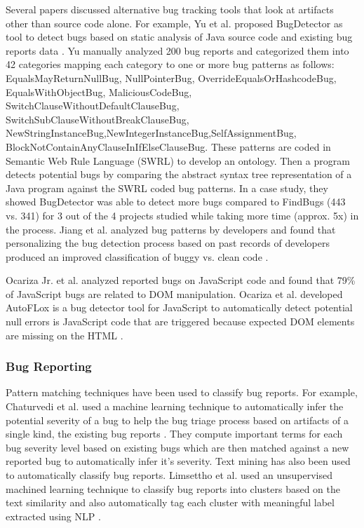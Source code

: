 \documentclass[conference]{IEEEtran}
\begin{document}
Several papers discussed alternative bug tracking tools that look at artifacts other than source code alone. For example, Yu et al. proposed BugDetector as tool to detect bugs based on static analysis of Java source code and existing bug reports data \cite{ontology_lu}. Yu manually analyzed 200 bug reports and categorized them into 42 categories mapping each category to one or more bug patterns as follows: EqualsMayReturnNullBug, NullPointerBug, OverrideEqualsOrHashcodeBug, EqualsWithObjectBug, MaliciousCodeBug, SwitchClauseWithoutDefaultClauseBug, SwitchSubClauseWithoutBreakClauseBug, NewStringInstanceBug,NewIntegerInstanceBug,SelfAssignmentBug, BlockNotContainAnyClauseInIfElseClauseBug. These patterns are coded in Semantic Web Rule Language (SWRL) to develop an ontology. Then a program detects potential bugs by comparing the abstract syntax tree representation of a Java program against the SWRL coded bug patterns. In a case study, they showed BugDetector was able to detect more bugs compared to FindBugs (443 vs. 341) for 3 out of the 4 projects studied while taking more time (approx. 5x) in the process. Jiang et al. analyzed bug patterns by developers and found that personalizing the bug detection process based on past records of developers produced an improved classification of buggy vs. clean code \cite{Personalized_Jiang}.

Ocariza Jr. et al. analyzed reported bugs on JavaScript code and found that 79\% of JavaScript bugs are related to DOM manipulation. Ocariza et al. developed AutoFLox is a bug detector tool for JavaScript to automatically detect potential null errors is JavaScript code that are triggered because expected DOM elements are missing on the HTML \cite{AutoFLox_Ocariza}.

\subsubsection{Bug Reporting}
Pattern matching techniques have been used to classify bug reports. For example, Chaturvedi et al. used a machine learning technique to automatically infer the potential severity of a bug to help the bug triage process based on artifacts of a single kind, the existing bug reports \cite{determining_chaturvedi}. They compute important terms for each bug severity level based on existing bugs which are then matched against a new reported bug to automatically infer it's severity. Text mining has also been used to automatically classify bug reports. Limsettho et al. used an unsupervised machined learning technique to classify bug reports into clusters based on the text similarity and also automatically tag each cluster with meaningful label extracted using NLP \cite{Automatic_Limsettho}.
\end{document}
